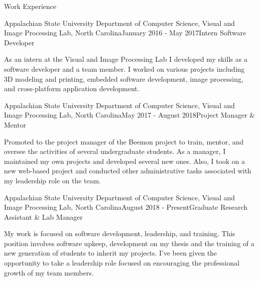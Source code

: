 \documentclass{resume} %
\begin{document}

\begin{rSection}{Work Experience}

\begin{rSubsection}{Appalachian State University Department of Computer Science, Visual and Image Processing Lab, North Carolina}{January 2016 - May 2017}{Intern Software Developer}{}
\item As an intern at the Visual and Image Processing Lab I developed my skills as a software developer and a team member.  I worked on various projects including 3D modeling and printing, embedded software development, image processing, and cross-platform application development.  
\end{rSubsection}

\begin{rSubsection}{Appalachian State University Department of Computer Science, Visual and Image Processing Lab, North Carolina}{May 2017 - August 2018}{Project Manager \& Mentor}{}
\item Promoted to the project manager of the Beemon project to train, mentor, and oversee the activities of several undergraduate students.  As a manager, I maintained my own projects and developed several new ones. Also, I took on a new web-based project and conducted other administrative tasks associated with my leadership role on the team.  
\end{rSubsection}

\begin{rSubsection}{Appalachian State University Department of Computer Science, Visual and Image Processing Lab, North Carolina}{August 2018 - Present}{Graduate Research Assistant \& Lab Manager}{}
\item My work is focused on software development, leadership, and training.  This position involves software upkeep, development on my thesis and the training of a new generation of students to inherit my projects. I’ve been given the opportunity to take a leadership role focused on encouraging the professional growth of my team members.
\end{rSubsection}

\end{rSection}

\end{document}
